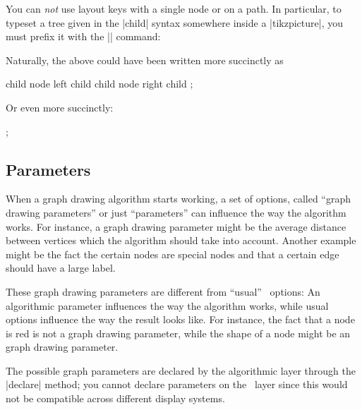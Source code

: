 \begin{command}{\pgfgdsetrequestcallback{}}
    You can \emph{not} use layout keys with a single node or on a path. In
    particular, to typeset a tree given in the |child| syntax somewhere inside
    a |{tikzpicture}|, you must prefix it with the |\scoped| command:
\begin{codeexample}[preamble={\usetikzlibrary{graphs,graphdrawing}
\usegdlibrary{trees}}]
\end{codeexample}
    Naturally, the above could have been written more succinctly as
\begin{codeexample}[preamble={\usetikzlibrary{graphs,graphdrawing}
\usegdlibrary{trees}}]
  child { node {left child} }
  child { node {right child} };
\end{codeexample}
    Or even more succinctly:
\begin{codeexample}[preamble={\usetikzlibrary{graphs,graphdrawing}
\usegdlibrary{trees}}]
\tikz {};
\end{codeexample}
\end{command}


\subsection{Parameters}
\label{section-gd-parameters}

When a graph drawing algorithm starts working, a set of options, called ``graph
drawing parameters'' or just ``parameters'' can influence the way the algorithm
works. For instance, a graph drawing parameter might be the average distance
between vertices which the algorithm should take into account. Another example
might be the fact the certain nodes are special nodes and that a certain edge
should have a large label.

These graph drawing parameters are different from ``usual'' \pgfname\ options:
An algorithmic parameter influences the way the algorithm works, while usual
options influence the way the result looks like. For instance, the fact that a
node is red is not a graph drawing parameter, while the shape of a node might
be an graph drawing parameter.

The possible graph parameters are declared by the algorithmic layer through the
|declare| method; you cannot declare parameters on the \pgfname\ layer since
this would not be compatible across different display systems.

